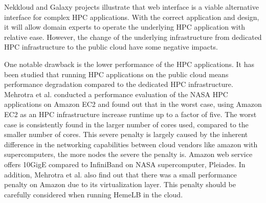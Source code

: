 %
%
%

Nekkloud and Galaxy projects illustrate that web interface is a viable alternative interface for complex HPC applications. With the correct application and design, it will allow domain experts to operate the underlying HPC application with relative ease. However,  the change of the underlying infrastructure from dedicated HPC infrastructure to the public cloud have some negative impacts.

One notable drawback is the lower performance of the HPC applications. It has been studied that running HPC applications on the public cloud means performance degradation compared to the dedicated HPC infrastructure. Mehrotra et al. \citep{mehrotra2012performance} conducted a performance evaluation of the NASA HPC applications on Amazon EC2 and found out that in the worst case, using Amazon EC2 as an HPC infrastructure increase runtime up to a factor of five. The worst case is consistently found in the larger number of cores used, compared to the smaller number of cores. This severe penalty is largely caused by the inherent difference in the networking capabilities between cloud vendors like amazon with supercomputers, the more nodes the severe the penalty is.  Amazon web service offers 10GigE compared to InfiniBand on NASA supercomputer, Pleiades. In addition, Mehrotra et al. also find out that there was a small performance penalty on Amazon due to its virtualization layer. This  penalty should be carefully considered when running HemeLB in the cloud.

